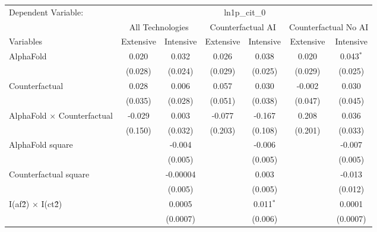 \begingroup
\centering
\begin{tabular}{lcccccc}
   \tabularnewline \midrule \midrule
   Dependent Variable: & \multicolumn{6}{c}{ln1p\_cit\_0}\\
 & \multicolumn{2}{c}{All Technologies} & \multicolumn{2}{c}{Counterfactual AI} & \multicolumn{2}{c}{Counterfactual No AI} \\
\cmidrule(lr){1-1}\cmidrule(lr){2-3} \cmidrule(lr){4-5} \cmidrule(lr){6-7}
Variables & \multicolumn{1}{c}{Extensive} & \multicolumn{1}{c}{Intensive} & \multicolumn{1}{c}{Extensive} & \multicolumn{1}{c}{Intensive} & \multicolumn{1}{c}{Extensive} & \multicolumn{1}{c}{Intensive} \\
\cmidrule(lr){1-1}\cmidrule(lr){2-2} \cmidrule(lr){3-3} \cmidrule(lr){4-4} \cmidrule(lr){5-5} \cmidrule(lr){6-6} \cmidrule(lr){7-7}
   AlphaFold                          & 0.020   & 0.032    & 0.026   & 0.038       & 0.020   & 0.043$^{*}$\\   
                                      & (0.028) & (0.024)  & (0.029) & (0.025)     & (0.029) & (0.025)\\   
   Counterfactual                     & 0.028   & 0.006    & 0.057   & 0.030       & -0.002  & 0.030\\   
                                      & (0.035) & (0.028)  & (0.051) & (0.038)     & (0.047) & (0.045)\\   
   AlphaFold $\times$ Counterfactual  & -0.029  & 0.003    & -0.077  & -0.167      & 0.208   & 0.036\\   
                                      & (0.150) & (0.032)  & (0.203) & (0.108)     & (0.201) & (0.033)\\   
   AlphaFold square                   &         & -0.004   &         & -0.006      &         & -0.007\\   
                                      &         & (0.005)  &         & (0.005)     &         & (0.005)\\   
   Counterfactual square              &         & -0.00004 &         & 0.003       &         & -0.013\\   
                                      &         & (0.005)  &         & (0.005)     &         & (0.012)\\   
   I(af\^2) $\times$ I(ct\^2)         &         & 0.0005   &         & 0.011$^{*}$ &         & 0.0001\\   
                                      &         & (0.0007) &         & (0.006)     &         & (0.0007)\\   

\end{tabular}
